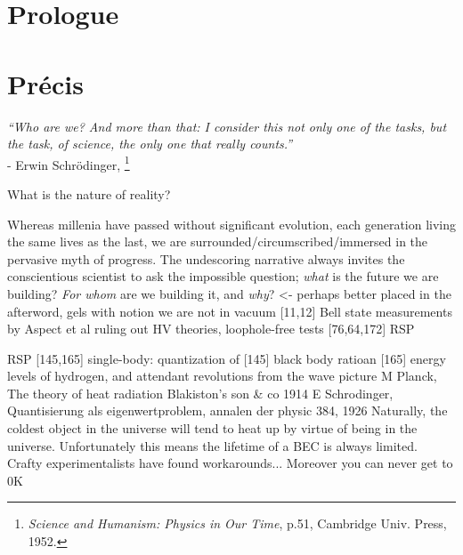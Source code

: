 \section*{Prologue}\label{sec:prologue}


\section*{Pr\'{e}cis}\label{sec:abstract}

\begin{adjustwidth}{6cm}{0cm}
\begin{flushright}
\emph{``Who are we? And more than that: I consider this not only one of the tasks, but the task, of science, the only one that really counts.''\\}
- Erwin Schr\"{o}dinger, \footnote{\emph{Science and Humanism: Physics in Our Time}, p.51, Cambridge Univ.
	Press, 1952.}\\
\end{flushright}
\end{adjustwidth}

	

What is the nature of reality?



	Whereas millenia have passed without significant evolution, each generation living the same lives as the last, we are surrounded/circumscribed/immersed in the pervasive myth of progress.
	The undescoring narrative always invites the conscientious scientist to ask the impossible question; \emph{what} is the future we are building? \emph{For whom} are we building it, and \emph{why}? <- perhaps better placed in the afterword, gels with notion we are not in vacuum
[11,12] Bell state measurements by Aspect et al ruling out HV theories, loophole-free tests [76,64,172] RSP


RSP [145,165] single-body: quantization of [145] black body ratioan [165] energy levels of hydrogen, and attendant revolutions from the wave picture  
		M Planck, The theory of heat radiation Blakiston's son \& co 1914
		E Schrodinger, Quantisierung als eigenwertproblem, annalen der physic 384, 1926
Naturally, the coldest object in the universe will tend to heat up by virtue of being in the universe.
	Unfortunately this means the lifetime of a BEC is always limited.
	Crafty experimentalists have found workarounds...
Moreover you can never get to 0K

